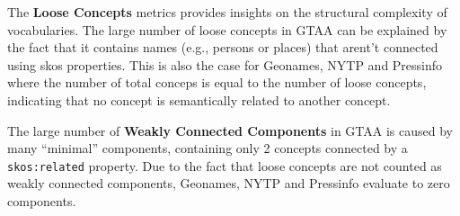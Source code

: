 The \textbf{Loose Concepts} metrics provides insights on the structural complexity of vocabularies. The large number of loose concepts in GTAA can be explained by the fact that it contains names (e.g., persons or places) that arent't connected using skos properties. This is also the case for Geonames, NYTP and Pressinfo where the number of total conceps is equal to the number of loose concepts, indicating that no concept is semantically related to another concept.

The large number of \textbf{Weakly Connected Components} in GTAA is caused by many ``minimal'' components, containing only 2 concepts connected by a \texttt{skos:related} property. Due to the fact that loose concepts are not counted as weakly connected components, Geonames, NYTP and Pressinfo evaluate to zero components.

